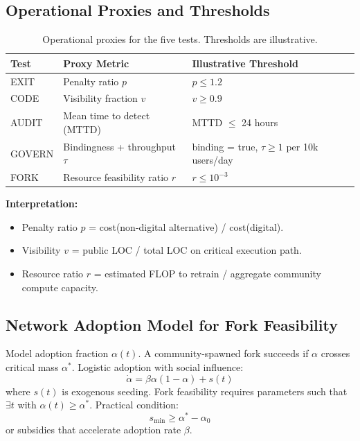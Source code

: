 \subsection{Operational Proxies and Thresholds}

\begin{table}[htbp]
\centering
\caption{Operational proxies for the five tests. Thresholds are illustrative.}
\label{tab:operational-proxies}
\begin{tabular}{lll}
\hline
\textbf{Test} & \textbf{Proxy Metric} & \textbf{Illustrative Threshold} \\
\hline
EXIT & Penalty ratio $p$ & $p \leq 1.2$ \\
CODE & Visibility fraction $v$ & $v \geq 0.9$ \\
AUDIT & Mean time to detect (MTTD) & MTTD $\leq$ 24 hours \\
GOVERN & Bindingness + throughput $\tau$ & binding = true, $\tau \geq 1$ per 10k users/day \\
FORK & Resource feasibility ratio $r$ & $r \leq 10^{-3}$ \\
\hline
\end{tabular}
\end{table}

\textbf{Interpretation:}
\begin{itemize}
    \item Penalty ratio $p$ = cost(non-digital alternative) / cost(digital).
    \item Visibility $v$ = public LOC / total LOC on critical execution path.
    \item Resource ratio $r$ = estimated FLOP to retrain / aggregate community compute capacity.
\end{itemize}

\subsection{Network Adoption Model for Fork Feasibility}

Model adoption fraction $\alpha(t)$. A community-spawned fork succeeds if $\alpha$ crosses critical mass $\alpha^*$. Logistic adoption with social influence:
\begin{equation}
\dot{\alpha} = \beta \alpha(1 - \alpha) + s(t)
\end{equation}
where $s(t)$ is exogenous seeding. Fork feasibility requires parameters such that $\exists t$ with $\alpha(t) \geq \alpha^*$. Practical condition:
\begin{equation}
s_{\min} \geq \alpha^* - \alpha_0
\end{equation}
or subsidies that accelerate adoption rate $\beta$.

